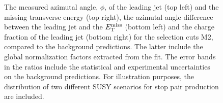 \begin{figure}[!ht]
\begin{center}
{    }
  \end{center}
  \caption[Kinematic distributions of the azimutal angle, $\phi$, of the leading jet and the missing transverse energy, the azimutal angle difference between the leading jet and the $\met$, and the charge fraction of the leading jet in the signal regions for the selection cuts of region M2, after the normalization factors extracted from the fit have been applied.]
{The measured azimutal angle, $\phi$, of the leading jet (top left) and the missing transverse energy (top right), the azimutal angle difference between the leading jet and the $\met$ (bottom left) and the charge fraction of the leading jet (bottom right) for the selection cuts M2, compared to the background predictions. The latter include the global normalization factors extracted from the fit. The error bands in the ratios include the statistical and experimental uncertainties on the background predictions. For illustration purposes, the distribution of two different SUSY scenarios for stop pair production are included.}
  \label{fig:Plot_M2_SR_Jet1}
\end{figure}

